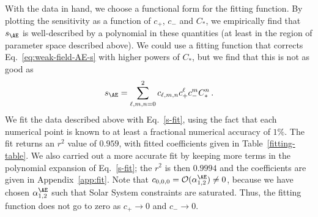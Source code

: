 \documentclass[prd,aps,twocolumn,nofootinbib,showpacs,superscriptaddress]{revtex4-1}
\newcommand\be{\begin{equation}}
\newcommand\ee{\end{equation}}
\begin{document}
With the data in hand, we  choose a functional form for the fitting function. 
By plotting the sensitivity as a function of $c_{+}$, $c_{-}$ and $C_{*}$, we empirically
find that $s_{\AE}$ is well-described by a polynomial in these quantities 
(at least in the region of parameter space described above). We could use a fitting
function that corrects Eq.~\eqref{eq:weak-field-AE-s} with higher powers of $C_{*}$, 
but we find that this is not as good as  
%
\be 
\label{s-fit}
s_{\AE} = \sum_{\ell,m,n=0}^{2} c_{\ell, m, n} c_{+}^{\ell} c_{-}^{m} C_{*}^{n}\,.
\ee
%
We fit the data described above with Eq.~\eqref{s-fit}, using the fact that each numerical point 
is known to at least a fractional numerical accuracy of $1\%$. The fit returns an $r^{2}$ value of $0.959$, 
with fitted coefficients given in Table~\ref{fitting-table}. We also carried out a more accurate fit 
by keeping more terms in the polynomial expansion of Eq.~\eqref{s-fit}; the $r^{2}$ is then $0.9994$ 
and the coefficients are given in Appendix~\ref{app:fit}.  Note that $c_{0,0,0}  = {\cal{O}}(\alpha_{1,2}^{\AE}) \neq 0$, 
because we have chosen $\alpha_{1,2}^{\AE}$ such that Solar System constraints are saturated. Thus, the
fitting function does not go to zero as $c_{+} \to 0$ and $c_{-} \to 0$. 
\end{document}
